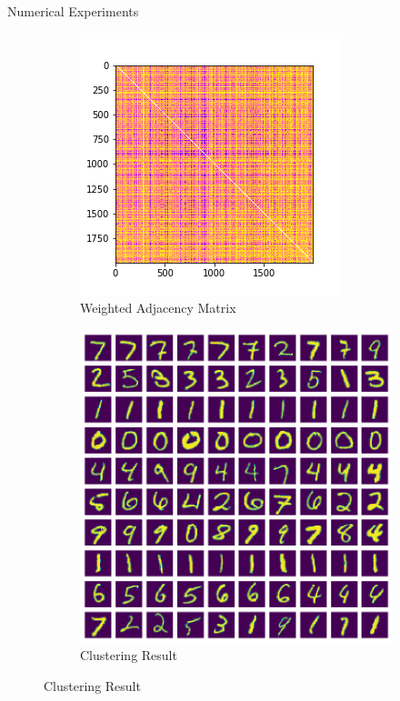 \documentclass[10pt,a4paper, nocenter]{beamer}
\begin{document}
\begin{frame}{Numerical Experiments}
\begin{figure}[h]
\begin{center}
				\begin{subfigure}[b]{0.45\textwidth}
					\centering
					\includegraphics[width=\textwidth]{../../images/w_2norm.png}
					\caption{Weighted Adjacency Matrix}
					\label{fig:w_2norm}
				\end{subfigure}           
				\begin{subfigure}[b]{0.45\textwidth}
					\centering
					\includegraphics[width=\textwidth]{../../images/number_clustering_10_2norm.png}
					\caption{Clustering Result}
					\label{fig:clustering_10_2norm}
				\end{subfigure}           


\end{center}
\end{figure}
\end{frame}
\end{document}
